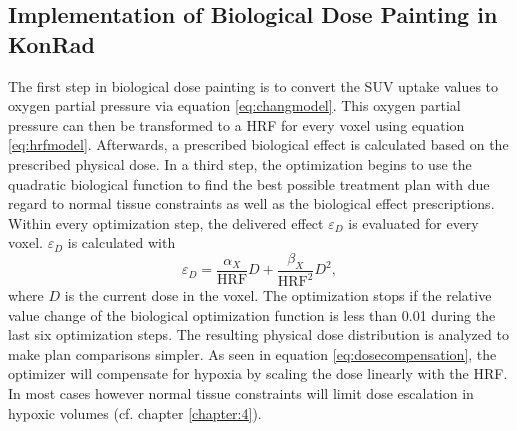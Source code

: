 \subsection{Implementation of Biological Dose Painting in KonRad}
The first step in biological dose painting is to convert the SUV uptake values to oxygen partial pressure via equation \ref{eq:changmodel}. This oxygen partial pressure can then be transformed to a HRF for every voxel using equation \ref{eq:hrfmodel}. Afterwards, a prescribed biological effect is calculated based on the prescribed physical dose. In a third step, the optimization begins to use the quadratic biological function to find the best possible treatment plan with due regard to normal tissue constraints as well as the biological effect prescriptions. Within every optimization step, the delivered effect $\varepsilon_D$  is evaluated for every voxel. $\varepsilon_D$ is calculated with
\begin{equation}
\varepsilon_D = \frac{\alpha_X}{\mathrm{HRF}}D+\frac{\beta_X}{\mathrm{HRF}^2}D^2,
\end{equation}
where $D$ is the current dose in the voxel. The optimization stops if the relative value change of the biological optimization function is less than 0.01 during the last six optimization steps. The resulting physical dose distribution is analyzed to make plan comparisons simpler. As seen in equation \ref{eq:dosecompensation}, the optimizer will compensate for hypoxia by scaling the dose linearly with the HRF. In most cases however normal tissue constraints will limit dose escalation in hypoxic volumes (cf. chapter \ref{chapter:4}).
